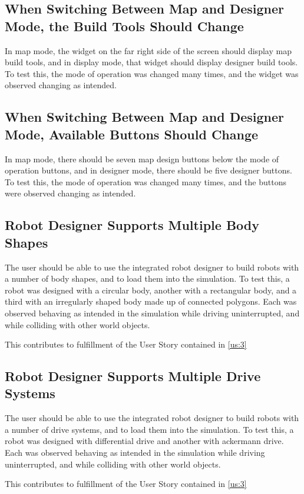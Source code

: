 \subsection{When Switching Between Map and Designer Mode, the Build Tools Should Change}
In map mode, the widget on the far right side of the screen should display map build tools, and in display mode, that widget should display designer build tools. To test this, the mode of operation was changed many times, and the widget was observed changing as intended.

\subsection{When Switching Between Map and Designer Mode, Available Buttons Should Change}
In map mode, there should be seven map design buttons below the mode of operation buttons, and in designer mode, there should be five designer buttons. To test this, the mode of operation was changed many times, and the buttons were observed changing as intended.

\subsection{Robot Designer Supports Multiple Body Shapes}
The user should be able to use the integrated robot designer to build robots with a number of body shapes, and to load them into the simulation. To test this, a robot was designed with a circular body, another with a rectangular body, and a third with an irregularly shaped body made up of connected polygons. Each was observed behaving as intended in the simulation while driving uninterrupted, and while colliding with other world objects.

This contributes to fulfillment of the User Story contained in \ref{us:3}

\subsection{Robot Designer Supports Multiple Drive Systems}
The user should be able to use the integrated robot designer to build robots with a number of drive systems, and to load them into the simulation. To test this, a robot was designed with differential drive and another with ackermann drive. Each was observed behaving as intended in the simulation while driving uninterrupted, and while colliding with other world objects.

This contributes to fulfillment of the User Story contained in \ref{us:3}

